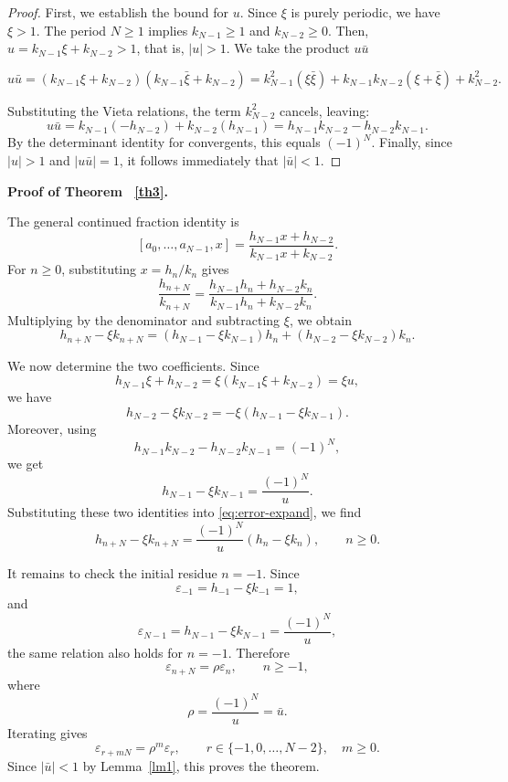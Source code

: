 \documentclass[]{interact}
\theoremstyle{plain}
\numberwithin{equation}{section} %
\numberwithin{table}{section} %
\numberwithin{figure}{section}
\begin{document}
\begin{proof}

First, we establish the bound for $u$. Since $\xi$ is purely periodic, we have $\xi > 1$. The period $N \ge 1$ implies $k_{N-1} \ge 1$ and $k_{N-2} \ge 0$. Then, $u = k_{N-1}\xi + k_{N-2} > 1$, that is, $|u|>1$. We take  the product $u\bar{u}$ 


$$u\bar{u} = (k_{N-1}\xi + k_{N-2})(k_{N-1}\bar {\xi} + k_{N-2})= k_{N-1}^2(\xi\bar{\xi}) + k_{N-1}k_{N-2}(\xi + \bar{\xi}) + k_{N-2}^2.$$

Substituting the Vieta relations, the term $k_{N-2}^2$ cancels, leaving:
$$
u\bar{u} = k_{N-1}(-h_{N-2}) + k_{N-2}(h_{N-1}) = h_{N-1}k_{N-2} - h_{N-2}k_{N-1}.
$$
By the determinant identity for convergents, this equals $(-1)^N$. Finally, since $|u| > 1$ and $|u\bar{u}| = 1$, it follows immediately that $|\bar{u}| < 1$.
\end{proof}





\textbf{Proof of Theorem ~\ref{th3}.}



The general continued fraction identity is
\[
[a_0,\dots,a_{N-1},x]
=
\frac{h_{N-1}x+h_{N-2}}{k_{N-1}x+k_{N-2}}.
\]
For \(n\ge0\), substituting \(x=h_n/k_n\) gives
\[
\frac{h_{n+N}}{k_{n+N}}
=
\frac{h_{N-1}h_n+h_{N-2}k_n}
{k_{N-1}h_n+k_{N-2}k_n}.
\]
Multiplying by the denominator and subtracting \(\xi\), we obtain
\begin{equation}
h_{n+N}-\xi k_{n+N}
=
(h_{N-1}-\xi k_{N-1})h_n
+
(h_{N-2}-\xi k_{N-2})k_n.
\label{eq:error-expand}
\end{equation}

We now determine the two coefficients. Since
\[
h_{N-1}\xi+h_{N-2}
=
\xi(k_{N-1}\xi+k_{N-2})
=
\xi u,
\]
we have
\[
h_{N-2}-\xi k_{N-2}
=
-\xi(h_{N-1}-\xi k_{N-1}).
\]
Moreover, using
\[
h_{N-1}k_{N-2}-h_{N-2}k_{N-1}=(-1)^N,
\]
we get
\[
h_{N-1}-\xi k_{N-1}
=
\frac{(-1)^N}{u}.
\]
Substituting these two identities into \eqref{eq:error-expand}, we find
\[
h_{n+N}-\xi k_{n+N}
=
\frac{(-1)^N}{u}(h_n-\xi k_n),
\qquad n\ge0.
\]

It remains to check the initial residue \(n=-1\). Since
\[
\varepsilon_{-1}=h_{-1}-\xi k_{-1}=1,
\]
and
\[
\varepsilon_{N-1}=h_{N-1}-\xi k_{N-1}
=
\frac{(-1)^N}{u},
\]
the same relation also holds for \(n=-1\). Therefore
\[
\varepsilon_{n+N}=\rho\varepsilon_n,
\qquad n\ge -1,
\]
where
\[
\rho=\frac{(-1)^N}{u}=\bar u.
\]
Iterating gives
\[
\varepsilon_{r+mN}=\rho^m\varepsilon_r,
\qquad
r\in\{-1,0,\dots,N-2\},\quad m\ge0.
\]
Since \(|\bar u|<1\) by Lemma~\ref{lm1}, this proves the theorem.
\end{document}
